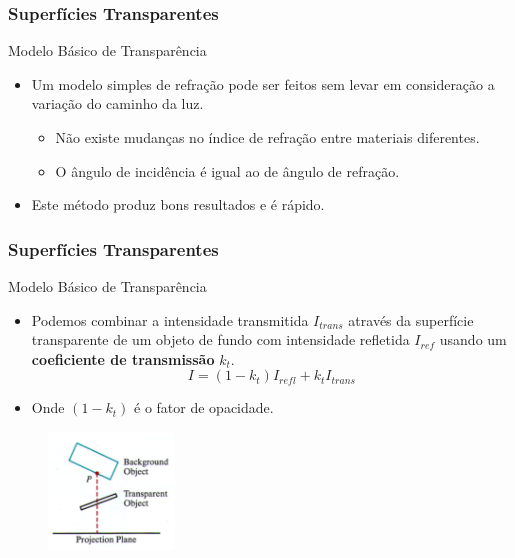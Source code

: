 \documentclass{beamer}
\begin{document}
\begin{frame}
\frametitle{Superfícies Transparentes}

	\begin{block}{Modelo Básico de Transparência}
		\begin{itemize}
			\item Um modelo simples de refração pode ser feitos sem levar em consideração a variação do caminho da luz.
			\begin{itemize}
				\item Não existe mudanças no índice de refração entre materiais diferentes.
				\item O ângulo de incidência é igual ao de ângulo de refração.
			\end{itemize}
			\item Este método produz bons resultados e é rápido.
		\end{itemize}
	\end{block}
\end{frame}

\begin{frame}
\frametitle{Superfícies Transparentes}

	\begin{block}{Modelo Básico de Transparência}
		\begin{itemize}
			\item Podemos combinar a intensidade transmitida $I_{trans}$ através da superfície transparente de um objeto de fundo com intensidade refletida $I_{ref}$ usando um \textbf{coeficiente de transmissão} $k_t$.
			\begin{equation*}
				I = (1-k_t) I_{refl} + k_t I_{trans}
			\end{equation*}
			\item Onde $(1-k_t)$ é o fator de opacidade.
		\end{itemize}
	\end{block}

	\begin{figure}[!h]
		\begin{center}
		\includegraphics[width=0.3\textwidth]{Figures/OpcFac}
		\end{center}
	\end{figure}	
\end{frame}
\end{document}
